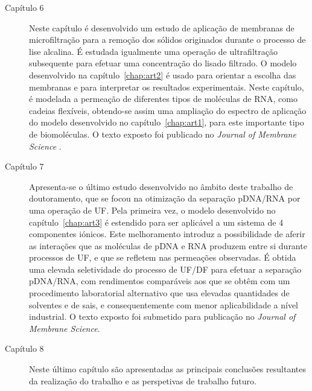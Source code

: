 \begin{description}
	\item[Capítulo 6] Neste capítulo é desenvolvido um estudo de aplicação de membranas de  microfiltração para a remoção dos sólidos originados durante o processo de lise alcalina. É estudada igualmente uma operação de ultrafiltração subsequente para efetuar uma concentração do lisado filtrado. O modelo desenvolvido na capítulo~\ref{chap:art2} é usado para orientar a escolha das membranas e para interpretar os resultados experimentais. Neste capítulo, é modelada a permeação de diferentes tipos de moléculas de RNA, como cadeias flexíveis, obtendo-se assim uma ampliação do espectro de aplicação do modelo desenvolvido no capítulo~\ref{chap:art1}, para este importante tipo de biomoléculas. O texto exposto foi publicado no \emph{Journal of Membrane Science} \cite{meu3}.
	\item[Capítulo 7] Apresenta-se o último estudo desenvolvido  no âmbito deste trabalho de doutoramento, que se focou na otimização da separação pDNA/RNA por uma operação de UF. Pela primeira vez, o modelo desenvolvido no capítulo~\ref{chap:art3} é estendido para ser aplicável a um sistema de 4 componentes iónicos. Este melhoramento introduz a possibilidade de aferir as interações que as moléculas de pDNA e RNA produzem entre si durante processos de UF, e que se refletem nas permeações observadas. É obtida uma elevada seletividade do processo de UF/DF para efetuar a separação pDNA/RNA, com rendimentos comparáveis aos que se obtêm com um procedimento laboratorial alternativo que usa elevadas quantidades de solventes e de sais, e consequentemente com menor aplicabilidade a nível industrial. O texto exposto foi submetido para publicação no \emph{Journal of Membrane Science}.
	\item[Capítulo 8] Neste último capítulo são apresentadas as principais conclusões resultantes da realização do trabalho e as perspetivas de trabalho futuro.  
\end{description}
